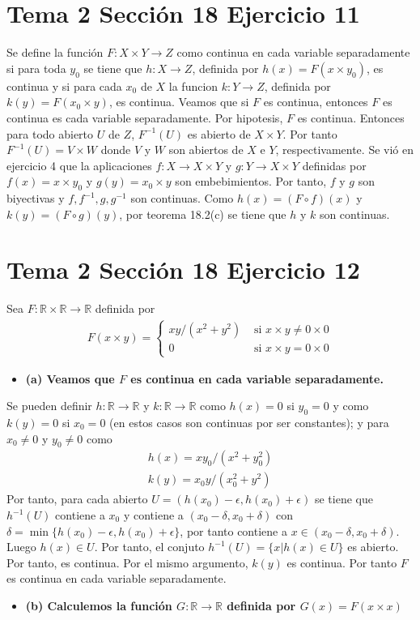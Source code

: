 \documentclass{article}
\begin{document}
\section{Tema 2 Sección 18 Ejercicio 11}
Se define la función $F:X\times Y\rightarrow Z$ como continua en cada variable separadamente si para toda $y_0$ se tiene que $h:X\rightarrow Z$, definida por $h(x)=F(x\times y_0)$, es continua y si para cada $x_0$ de $X$ la funcion $k:Y\rightarrow Z$, definida por $k(y)=F(x_0\times y)$, es continua. Veamos que si $F$ es continua, entonces $F$ es continua es cada variable separadamente.
Por hipotesis, $F$ es continua. Entonces para todo abierto $U$ de $Z$, $F^{-1}(U)$ es abierto de $X\times Y$. Por tanto $F^{-1}(U)=V\times W$ donde $V$ y $W$ son abiertos de $X$ e $Y$, respectivamente. Se vió en ejercicio 4 que la aplicaciones $f: X\rightarrow X\times Y$ y $g:Y\rightarrow X\times Y$ definidas por $f(x)=x\times y_0$ y $g(y)=x_0\times y$ son embebimientos. Por tanto, $f$ y $g$ son biyectivas y $f,f^{-1},g,g^{-1}$ son continuas. Como $h(x)=(F\circ f)(x)$ y $k(y)=(F\circ g)(y)$, por teorema 18.2(c) se tiene que $h$ y $k$ son continuas.
\section{Tema 2 Sección 18 Ejercicio 12}
Sea $F:\mathbb{R}\times \mathbb{R}\rightarrow \mathbb{R}$ definida por 
\begin{eqnarray}
F(x\times y)=\left\{
\begin{array}{ll}
xy/(x^2+y^2) &\text{ si }  x\times y\neq 0\times 0 \\
0 & \text{ si }  x\times y= 0\times 0 
\end{array}
\right.
\end{eqnarray}
\begin{itemize}
\item \bf(a) \rm Veamos que $F$ es continua en cada variable separadamente.
\end{itemize}
Se pueden definir $h:\mathbb{R}\rightarrow \mathbb{R}$ y $k:\mathbb{R}\rightarrow \mathbb{R}$
como $h(x)=0$ si $y_0=0$ y como $k(y)=0$ si $x_0=0$ (en estos casos son continuas por ser constantes); y para $x_0\neq 0$ y $y_0\neq 0$ como
\begin{eqnarray}
h(x)=xy_0/(x^2+y_0^2)\nonumber\\
k(y)=x_0y/(x_0^2+y^2)\nonumber
\end{eqnarray}
Por tanto, para cada abierto $U=(h(x_0)-\epsilon,h(x_0)+\epsilon)$ se tiene que $h^{-1}(U)$ contiene a $x_0$ y contiene a $(x_0-\delta, x_0+\delta)$ con $\delta =\min \{h(x_0)-\epsilon,h(x_0)+\epsilon\}$, por tanto contiene a  $x\in(x_0-\delta, x_0+\delta) $. Luego $h(x)\in U$. Por tanto, el conjuto $h^{-1}(U)=\{x|h(x)\in U\}$ es abierto. Por tanto, es continua. Por el mismo argumento, $k(y)$ es continua. Por tanto $F$ es continua en cada variable separadamente.
\begin{itemize}
\item \bf(b) \rm Calculemos la función $G:\mathbb{R}\rightarrow\mathbb{R}$ definida por $G(x)=F(x\times x)$
\end{itemize}
\end{document}

